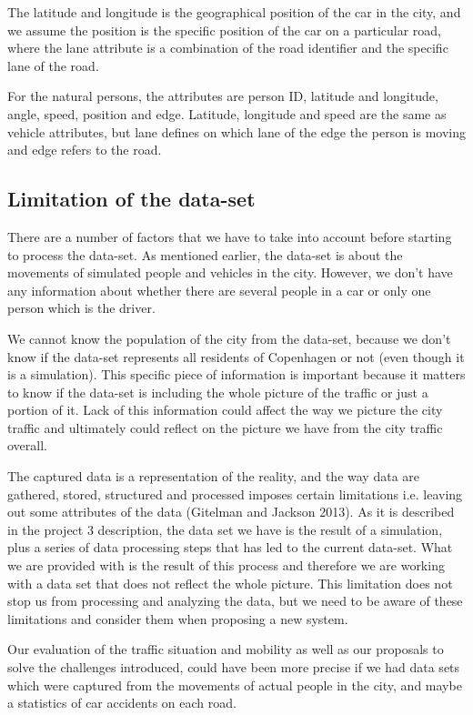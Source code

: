 \documentclass[format=acmsmall, review=false, screen=true]{acmart}
\begin{document}
The latitude and longitude is the geographical position of the car in the city, and we assume the position is the specific position of the car on a particular road, where the lane attribute is a combination of the road identifier and the specific lane of the road.

For the natural persons, the attributes are person ID, latitude and longitude, angle, speed, position and edge. Latitude, longitude and speed are the same as vehicle attributes, but lane defines on which lane of the edge the person is moving and edge refers to the road.

\subsection{Limitation of the data-set}
There are a number of factors that we have to take into account before starting to process the data-set. As mentioned earlier, the data-set is about the movements of simulated people and vehicles in the city. However, we don’t have any information about whether there are several people in a car or only one person which is the driver.

We cannot know the population of the city from the data-set, because we don’t know if the data-set represents all residents of Copenhagen or not (even though it is a simulation). This specific piece of information is important because it matters to know if the data-set is including the whole picture of the traffic or just a portion of it. Lack of this information could affect the way we picture the city traffic and ultimately could reflect on the picture we have from the city traffic overall.

The captured data is a representation of the reality, and the way data are gathered, stored, structured and processed imposes certain limitations i.e. leaving out some attributes of the data (Gitelman and Jackson 2013). As it is described in the project 3 description, the data set we have is the result of a simulation, plus a series of data processing steps that has led to the current data-set. What we are provided with is the result of this process and therefore we are working with a data set that does not reflect the whole picture. This limitation does not stop us from processing and analyzing the data, but we need to be aware of these limitations and consider them when proposing a new system.

Our evaluation of the traffic situation and mobility as well as our proposals to solve the challenges introduced, could have been more precise if we had data sets which were captured from the movements of actual people in the city, and maybe a statistics of car accidents on each road.
\end{document}
